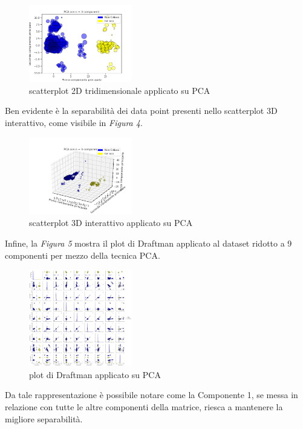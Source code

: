 \documentclass[11pt,a4paper,twocolumn]{article}
\begin{document}
	\begin{figure}[h]
		\centering
		\includegraphics[width=0.4\textwidth]{img/PCA_2Dnc3.png}
		\caption{scatterplot 2D tridimensionale applicato su PCA}
	\end{figure}
Ben evidente è la separabilità dei data point presenti nello scatterplot 3D interattivo, come visibile in \emph{Figura 4}.

	\begin{figure}[H]
		\centering
		\includegraphics[width=0.4\textwidth]{img/PCA_i3D.png}
		\caption{scatterplot 3D interattivo applicato su PCA}
	\end{figure}
\newpage
Infine, la \emph{Figura 5} mostra il plot di Draftman applicato al dataset ridotto a 9 componenti per mezzo della tecnica PCA.

	\begin{figure}[h]
		\centering
		\includegraphics[width=0.4\textwidth]{img/PCA_SPLOM.png}
		\caption{plot di Draftman applicato su PCA}
	\end{figure}

	Da tale rappresentazione è possibile notare come la Componente 1, se messa in relazione con tutte le altre componenti della matrice, riesca a mantenere la migliore separabilità.
\end{document}
